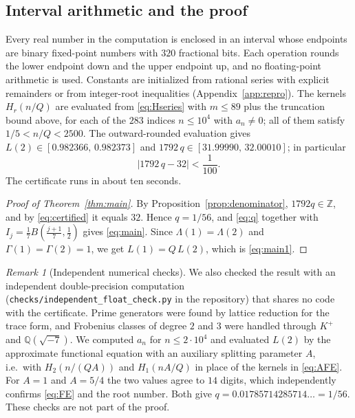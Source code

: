 \documentclass[11pt]{amsart}
\theoremstyle{remark}
\newtheorem{remark}[theorem]{Remark}
\theoremstyle{definition}
\newcommand{\Q}{\mathbb{Q}}
\newcommand{\Z}{\mathbb{Z}}
\begin{document}
\subsection{Interval arithmetic and the proof}
Every real number in the computation is enclosed in an interval whose endpoints are binary fixed-point numbers with $320$ fractional bits. Each operation rounds the lower endpoint down and the upper endpoint up, and no floating-point arithmetic is used. Constants are initialized from rational series with explicit remainders or from integer-root inequalities (Appendix~\ref{app:repro}). The kernels $H_r(n/Q)$ are evaluated from \eqref{eq:Hseries} with $m\le89$ plus the truncation bound above, for each of the $283$ indices $n\le10^4$ with $a_n\ne0$; all of them satisfy $1/5<n/Q<2500$. The outward-rounded evaluation gives $L(2)\in[0.982366,\,0.982373]$ and $1792\,q\in[31.99990,\,32.00010]$; in particular
\begin{equation}\label{eq:certified}
|1792\,q-32|<\frac{1}{100}.
\end{equation}
The certificate runs in about ten seconds.

\begin{proof}[Proof of Theorem~\ref{thm:main}]
By Proposition~\ref{prop:denominator}, $1792q\in\Z$, and by \eqref{eq:certified} it equals $32$. Hence $q=1/56$, and \eqref{eq:q} together with $I_j=\frac17B(\frac{j+1}{7},\frac12)$ gives \eqref{eq:main}. Since $\Lambda(1)=\Lambda(2)$ and $\Gamma(1)=\Gamma(2)=1$, we get $L(1)=Q\,L(2)$, which is \eqref{eq:main1}.
\end{proof}

\begin{remark}[Independent numerical checks]\label{rem:indep}
We also checked the result with an independent double-precision computation (\texttt{checks/independent\_float\_check.py} in the repository) that shares no code with the certificate. Prime generators were found by lattice reduction for the trace form, and Frobenius classes of degree $2$ and $3$ were handled through $K^+$ and $\Q(\sqrt{-7})$. We computed $a_n$ for $n\le2\cdot10^4$ and evaluated $L(2)$ by the approximate functional equation with an auxiliary splitting parameter $A$, i.e.\ with $H_2(n/(QA))$ and $H_1(nA/Q)$ in place of the kernels in \eqref{eq:AFE}. For $A=1$ and $A=5/4$ the two values agree to $14$ digits, which independently confirms \eqref{eq:FE} and the root number. Both give $q=0.01785714285714\ldots=1/56$. These checks are not part of the proof.
\end{remark}
\end{document}
